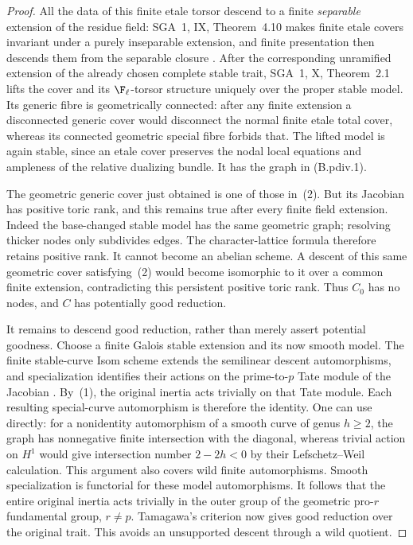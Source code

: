 \begin{proof}
All the data of this finite etale torsor descend to a finite
\emph{separable} extension of the residue field: SGA~1, IX,
Theorem~4.10 makes finite etale covers invariant under a purely
inseparable extension, and finite presentation then descends them
from the separable closure \citep{BC_SGA1}. After the corresponding
unramified extension of the already chosen complete stable trait,
SGA~1, X, Theorem~2.1 lifts the cover and its $\F_\ell$-torsor
structure uniquely over the proper stable model. Its generic fibre
is geometrically connected: after any finite extension a disconnected
generic cover would disconnect the normal finite etale total cover,
whereas its connected geometric special fibre forbids that.
The lifted model is again stable, since an etale cover preserves
the nodal local equations and ampleness of the relative dualizing
bundle. It has the graph in (B.pdiv.1).

The geometric generic cover just obtained is one of those in~(2).
But its Jacobian has positive toric rank, and this remains true after
every finite field extension. Indeed the base-changed stable model
has the same geometric graph; resolving thicker nodes only subdivides
edges. The character-lattice formula therefore retains positive rank.
It cannot become an abelian scheme. A descent of this same geometric
cover satisfying~(2) would become isomorphic to it over a common finite
extension, contradicting this persistent positive toric rank. Thus
$C_0$ has no nodes, and $C$ has potentially good reduction.

It remains to descend good reduction, rather than merely assert
potential goodness. Choose a finite Galois stable extension and its
now smooth model. The finite stable-curve Isom scheme extends the
semilinear descent automorphisms, and specialization identifies their
actions on the prime-to-$p$ Tate module of the Jacobian
\citep[Theorem 1.11]{BC_DM}. By~(1), the original inertia acts
trivially on that Tate module. Each resulting special-curve
automorphism is therefore the identity. One can use
\citet[Theorem 1.13, Lemma 1.14]{BC_DM} directly: for a nonidentity
automorphism of a smooth curve of genus $h\ge2$, the graph has
nonnegative finite intersection with the diagonal, whereas trivial
action on $H^1$ would give intersection number $2-2h<0$ by their
Lefschetz--Weil calculation. This argument also covers wild finite
automorphisms.
Smooth specialization is functorial for these model automorphisms.
It follows that the entire original inertia acts trivially in the
outer group of the geometric pro-$r$ fundamental group, $r\ne p$.
Tamagawa's criterion now gives good reduction over the original trait.
This avoids an unsupported descent through a wild quotient.
\end{proof}

